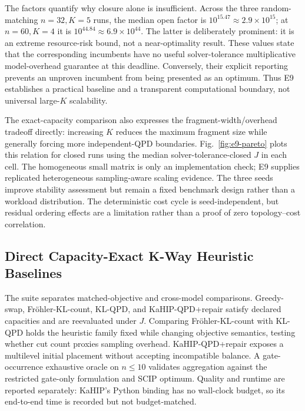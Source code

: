 \documentclass[11pt]{article}
\begin{document}
The factors quantify why closure alone is insufficient. Across the three random-matching $n=32,K=5$ runs, the median open factor is $10^{15.47}\approx2.9\times10^{15}$; at $n=60,K=4$ it is $10^{44.84}\approx6.9\times10^{44}$. The latter is deliberately prominent: it is an extreme resource-risk bound, not a near-optimality result. These values state that the corresponding incumbents have no useful solver-tolerance multiplicative model-overhead guarantee at this deadline. Conversely, their explicit reporting prevents an unproven incumbent from being presented as an optimum. Thus E9 establishes a practical baseline and a transparent computational boundary, not universal large-$K$ scalability.

The exact-capacity comparison also expresses the fragment-width/overhead tradeoff directly: increasing $K$ reduces the maximum fragment size while generally forcing more independent-QPD boundaries. Fig.~\ref{fig:e9-pareto} plots this relation for closed runs using the median solver-tolerance-closed $J$ in each cell. The homogeneous small matrix is only an implementation check; E9 supplies replicated heterogeneous sampling-aware scaling evidence. The three seeds improve stability assessment but remain a fixed benchmark design rather than a workload distribution. The deterministic cost cycle is seed-independent, but residual ordering effects are a limitation rather than a proof of zero topology--cost correlation.

\subsection{Direct Capacity-Exact K-Way Heuristic Baselines}

The suite separates matched-objective and cross-model comparisons. Greedy-swap, Fr{\"o}hler-KL-count, KL-QPD, and KaHIP-QPD+repair satisfy declared capacities and are reevaluated under $J$. Comparing Fr{\"o}hler-KL-count with KL-QPD holds the heuristic family fixed while changing objective semantics, testing whether cut count proxies sampling overhead. KaHIP-QPD+repair exposes a multilevel initial placement without accepting incompatible balance. A gate-occurrence exhaustive oracle on $n\leq10$ validates aggregation against the restricted gate-only formulation and SCIP optimum. Quality and runtime are reported separately: KaHIP's Python binding has no wall-clock budget, so its end-to-end time is recorded but not budget-matched.
\end{document}
